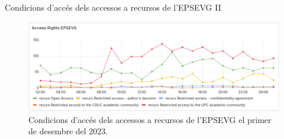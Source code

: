 \begin{frame}{Condicions d'accés dels accessos a recursos de l'EPSEVG II}
    \begin{figure}
        \includegraphics[width=\textwidth]{figures/access-rights-epsevg}
        \caption{Condicions d'accés dels accessos a recursos de l'EPSEVG el primer de desembre del 2023.}\label{fig:use-case-3}
    \end{figure}
\end{frame}